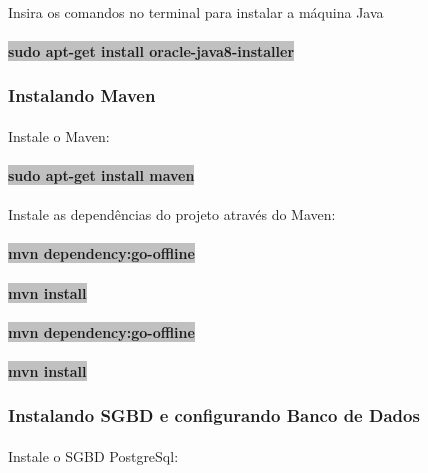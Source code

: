 \documentclass[	DIV=calc,%
							paper=a4,%
							fontsize=12pt,%
							onecolumn]{scrartcl}	 					%
\begin{document}
\paragraph{}
Insira os comandos no terminal para instalar a máquina Java
\paragraph{}
\textbf{\colorbox{Silver}{sudo apt-get install oracle-java8-installer}}
\subsubsection{Instalando Maven}
\paragraph{}
Instale o Maven:
\paragraph{}
\textbf{\colorbox{Silver}{sudo apt-get install maven}}
\paragraph{}
Instale as dependências do projeto através do Maven:
\paragraph{}
\textbf{\colorbox{Silver}{mvn dependency:go-offline}}
\paragraph{}
\textbf{\colorbox{Silver}{mvn install}}
\paragraph{}
\textbf{\colorbox{Silver}{mvn dependency:go-offline}}
\paragraph{}
\textbf{\colorbox{Silver}{mvn install}}
\subsubsection{Instalando SGBD e configurando Banco de Dados}
\paragraph{}
Instale o SGBD PostgreSql:
\end{document}
